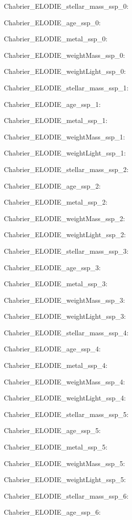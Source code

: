 \item Chabrier\_ELODIE\_stellar\_mass\_ssp\_0: 
\item Chabrier\_ELODIE\_age\_ssp\_0: 
\item Chabrier\_ELODIE\_metal\_ssp\_0: 
\item Chabrier\_ELODIE\_weightMass\_ssp\_0: 
\item Chabrier\_ELODIE\_weightLight\_ssp\_0: 
\item Chabrier\_ELODIE\_stellar\_mass\_ssp\_1: 
\item Chabrier\_ELODIE\_age\_ssp\_1: 
\item Chabrier\_ELODIE\_metal\_ssp\_1: 
\item Chabrier\_ELODIE\_weightMass\_ssp\_1: 
\item Chabrier\_ELODIE\_weightLight\_ssp\_1: 
\item Chabrier\_ELODIE\_stellar\_mass\_ssp\_2: 
\item Chabrier\_ELODIE\_age\_ssp\_2: 
\item Chabrier\_ELODIE\_metal\_ssp\_2: 
\item Chabrier\_ELODIE\_weightMass\_ssp\_2: 
\item Chabrier\_ELODIE\_weightLight\_ssp\_2: 
\item Chabrier\_ELODIE\_stellar\_mass\_ssp\_3: 
\item Chabrier\_ELODIE\_age\_ssp\_3: 
\item Chabrier\_ELODIE\_metal\_ssp\_3: 
\item Chabrier\_ELODIE\_weightMass\_ssp\_3: 
\item Chabrier\_ELODIE\_weightLight\_ssp\_3: 
\item Chabrier\_ELODIE\_stellar\_mass\_ssp\_4: 
\item Chabrier\_ELODIE\_age\_ssp\_4: 
\item Chabrier\_ELODIE\_metal\_ssp\_4: 
\item Chabrier\_ELODIE\_weightMass\_ssp\_4: 
\item Chabrier\_ELODIE\_weightLight\_ssp\_4: 
\item Chabrier\_ELODIE\_stellar\_mass\_ssp\_5: 
\item Chabrier\_ELODIE\_age\_ssp\_5: 
\item Chabrier\_ELODIE\_metal\_ssp\_5: 
\item Chabrier\_ELODIE\_weightMass\_ssp\_5: 
\item Chabrier\_ELODIE\_weightLight\_ssp\_5: 
\item Chabrier\_ELODIE\_stellar\_mass\_ssp\_6: 
\item Chabrier\_ELODIE\_age\_ssp\_6: 
